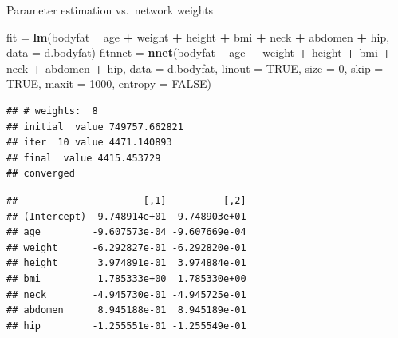 \documentclass[10pt,ignorenonframetext,]{beamer}
\newenvironment{Shaded}{\begin{snugshade}}{\end{snugshade}}
\newcommand{\KeywordTok}[1]{\textcolor[rgb]{0.13,0.29,0.53}{\textbf{#1}}}
\newcommand{\DataTypeTok}[1]{\textcolor[rgb]{0.13,0.29,0.53}{#1}}
\newcommand{\DecValTok}[1]{\textcolor[rgb]{0.00,0.00,0.81}{#1}}
\newcommand{\StringTok}[1]{\textcolor[rgb]{0.31,0.60,0.02}{#1}}
\newcommand{\OtherTok}[1]{\textcolor[rgb]{0.56,0.35,0.01}{#1}}
\newcommand{\OperatorTok}[1]{\textcolor[rgb]{0.81,0.36,0.00}{\textbf{#1}}}
\newcommand{\NormalTok}[1]{#1}
\begin{document}
\begin{frame}[fragile]

\begin{block}{Parameter estimation vs.~network weights}

\scriptsize

\begin{Shaded}
\begin{Highlighting}[]
\NormalTok{fit =}\StringTok{ }\KeywordTok{lm}\NormalTok{(bodyfat }\OperatorTok{~}\StringTok{ }\NormalTok{age }\OperatorTok{+}\StringTok{ }\NormalTok{weight }\OperatorTok{+}\StringTok{ }\NormalTok{height }\OperatorTok{+}\StringTok{ }\NormalTok{bmi }\OperatorTok{+}\StringTok{ }\NormalTok{neck }\OperatorTok{+}\StringTok{ }\NormalTok{abdomen }\OperatorTok{+}\StringTok{ }
\StringTok{    }\NormalTok{hip, }\DataTypeTok{data =}\NormalTok{ d.bodyfat)}
\NormalTok{fitnnet =}\StringTok{ }\KeywordTok{nnet}\NormalTok{(bodyfat }\OperatorTok{~}\StringTok{ }\NormalTok{age }\OperatorTok{+}\StringTok{ }\NormalTok{weight }\OperatorTok{+}\StringTok{ }\NormalTok{height }\OperatorTok{+}\StringTok{ }\NormalTok{bmi }\OperatorTok{+}\StringTok{ }\NormalTok{neck }\OperatorTok{+}\StringTok{ }\NormalTok{abdomen }\OperatorTok{+}\StringTok{ }
\StringTok{    }\NormalTok{hip, }\DataTypeTok{data =}\NormalTok{ d.bodyfat, }\DataTypeTok{linout =} \OtherTok{TRUE}\NormalTok{, }\DataTypeTok{size =} \DecValTok{0}\NormalTok{, }\DataTypeTok{skip =} \OtherTok{TRUE}\NormalTok{, }\DataTypeTok{maxit =} \DecValTok{1000}\NormalTok{, }
    \DataTypeTok{entropy =} \OtherTok{FALSE}\NormalTok{)}
\end{Highlighting}
\end{Shaded}

\begin{verbatim}
## # weights:  8
## initial  value 749757.662821 
## iter  10 value 4471.140893
## final  value 4415.453729 
## converged
\end{verbatim}

\begin{Shaded}
\end{Shaded}

\begin{verbatim}
##                      [,1]          [,2]
## (Intercept) -9.748914e+01 -9.748903e+01
## age         -9.607573e-04 -9.607669e-04
## weight      -6.292827e-01 -6.292820e-01
## height       3.974891e-01  3.974884e-01
## bmi          1.785333e+00  1.785330e+00
## neck        -4.945730e-01 -4.945725e-01
## abdomen      8.945188e-01  8.945189e-01
## hip         -1.255551e-01 -1.255549e-01
\end{verbatim}

\end{block}

\end{frame}
\end{document}
